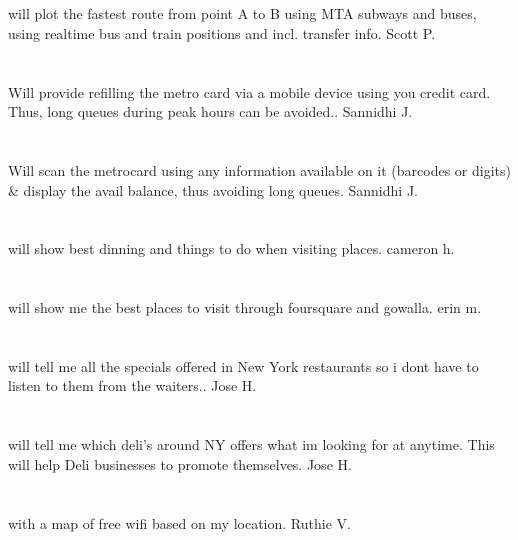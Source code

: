 \section{}will plot the fastest route from point A to B using MTA subways and buses,  using realtime bus and train positions and incl. transfer info. Scott P.
\section{}Will provide refilling the metro card via a mobile device using you credit card. Thus,  long queues during peak hours can be avoided.. Sannidhi J.
\section{}Will scan the metrocard using any information available on it (barcodes or digits) \& display the avail balance,  thus avoiding long queues. Sannidhi J.
\section{} will show best dinning and things to do when visiting places. cameron h.
\section{} will show me the best places to visit through foursquare and gowalla. erin m.
\section{}will tell me all the specials offered in New York restaurants so i dont have to listen to them from the waiters.. Jose H.
\section{}will tell me which deli's around NY offers what im looking for at anytime. This will help Deli businesses to promote themselves. Jose H.
\section{}with a map of free wifi based on my location. Ruthie V.
